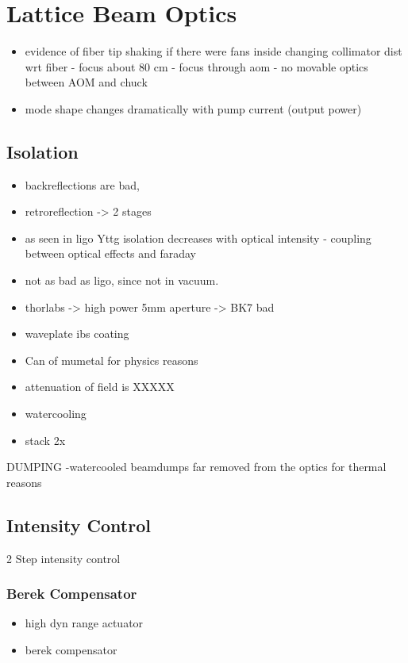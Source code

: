 \documentclass[twocolumn,aps,pra,showpacs,preprintnumbers,bibnotes]{revtex4-1}
\begin{document}
\section{Lattice Beam Optics}


\begin{itemize}
\item evidence of fiber tip shaking if there were fans inside
changing collimator dist wrt fiber - focus about 80 cm - focus through aom - no movable optics between AOM and chuck
\item mode shape changes dramatically with pump current (output power)
\end{itemize}

\subsection{Isolation}
\begin{itemize}
\item backreflections are bad,
\item retroreflection -> 2 stages
\item as seen in ligo Yttg isolation decreases with optical intensity - coupling between optical effects and faraday
\item not as bad as ligo, since not in vacuum.
\item thorlabs -> high power 5mm aperture -> BK7 bad
\item waveplate ibs coating
\item Can of mumetal for physics reasons
\item attenuation of field is XXXXX
\item watercooling
\item stack 2x
\end{itemize}

DUMPING
-watercooled beamdumps far removed from the optics for thermal reasons
\subsection{Intensity Control}
2 Step intensity control

\subsubsection{Berek Compensator}
\begin{itemize}
\item high dyn range actuator
\item berek compensator
\end{itemize}
\end{document}
